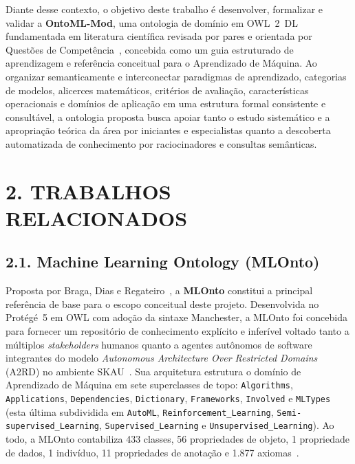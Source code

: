 \documentclass[11pt,a4paper]{article}
\newcommand{\onto}[1]{\texttt{\small #1}}
\begin{document}
Diante desse contexto, o objetivo deste trabalho é desenvolver, formalizar e validar a \textbf{OntoML-Mod}, uma ontologia de domínio em OWL~2~DL fundamentada em literatura científica revisada por pares e orientada por Questões de Competência~\cite{bezerra2013evaluating,potoniec2020dataset}, concebida como um guia estruturado de aprendizagem e referência conceitual para o Aprendizado de Máquina. Ao organizar semanticamente e interconectar paradigmas de aprendizado, categorias de modelos, alicerces matemáticos, critérios de avaliação, características operacionais e domínios de aplicação em uma estrutura formal consistente e consultável, a ontologia proposta busca apoiar tanto o estudo sistemático e a apropriação teórica da área por iniciantes e especialistas quanto a descoberta automatizada de conhecimento por raciocinadores e consultas semânticas.

\section{2. TRABALHOS RELACIONADOS}

\subsection{2.1. Machine Learning Ontology (MLOnto)}

Proposta por Braga, Dias e Regateiro~\cite{braga2020mlonto}, a \textbf{MLOnto} constitui a principal referência de base para o escopo conceitual deste projeto. Desenvolvida no Protégé~5 em OWL com adoção da sintaxe Manchester, a MLOnto foi concebida para fornecer um repositório de conhecimento explícito e inferível voltado tanto a múltiplos \emph{stakeholders} humanos quanto a agentes autônomos de software integrantes do modelo \emph{Autonomous Architecture Over Restricted Domains} (A2RD) no ambiente SKAU~\cite{braga2020mlonto}. Sua arquitetura estrutura o domínio de Aprendizado de Máquina em sete superclasses de topo: \onto{Algorithms}, \onto{Applications}, \onto{Dependencies}, \onto{Dictionary}, \onto{Frameworks}, \onto{Involved} e \onto{MLTypes} (esta última subdividida em \onto{AutoML}, \onto{Reinforcement\_Learning}, \onto{Semi-supervised\_Learning}, \onto{Supervised\_Learning} e \onto{Unsupervised\_Learning}). Ao todo, a MLOnto contabiliza 433 classes, 56 propriedades de objeto, 1 propriedade de dados, 1 indivíduo, 11 propriedades de anotação e 1.877 axiomas~\cite{braga2020mlonto}.
\end{document}
